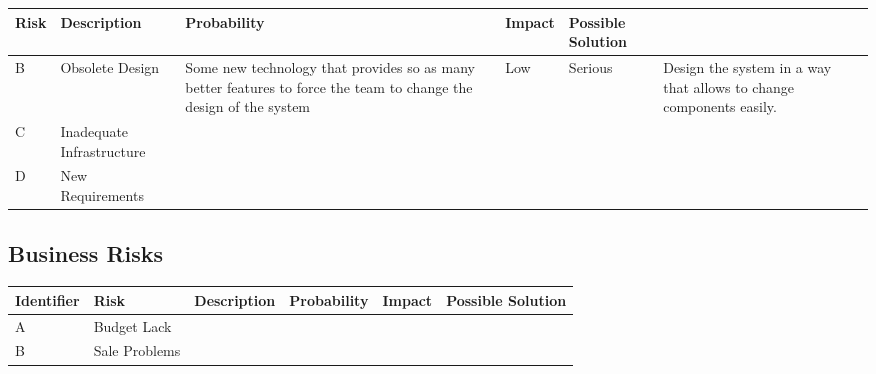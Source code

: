 \begin{adjustbox}{max width=\textwidth}
\begin{tabular}{|l|p{5 cm}|l|l|p{5cm}|}
\hline
Risk & Description & Probability & Impact & Possible Solution
\\ \hline
B & Obsolete Design & Some new technology that provides so as many better features to force the team to change the design of the system  & Low & Serious & Design the system in a way that allows to change components easily.
\\ \hline
C & Inadequate Infrastructure 
\\ \hline
D & New Requirements 
\end{tabular}
\end{adjustbox}
\subsection{Business Risks}

\begin{adjustbox}{max width=\textwidth}
\begin{tabular}{|l|l|l|l|l|l|}
\hline
Identifier & Risk & Description & Probability & Impact & Possible Solution
\\ \hline
A & Budget Lack 
\\ \hline
B & Sale Problems 

\end{tabular}
\end{adjustbox}